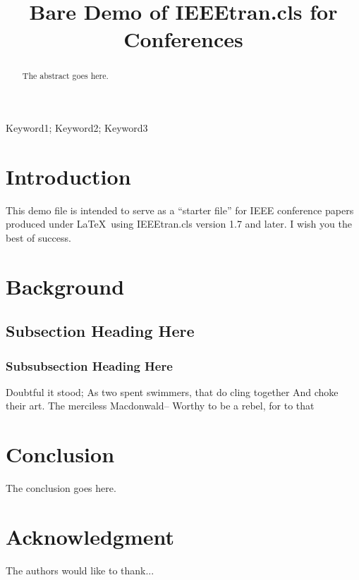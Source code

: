 \documentclass[conference, letterpaper]{IEEEtran}
\begin{document}
\title{Bare Demo of IEEEtran.cls for Conferences}

\author{
}

\maketitle


\begin{abstract}
The abstract goes here.
\end{abstract}


\begin{IEEEkeywords}
Keyword1; Keyword2; Keyword3
\end{IEEEkeywords}

\IEEEpeerreviewmaketitle



\section{Introduction}
This demo file is intended to serve as a ``starter file''
for IEEE conference papers produced under \LaTeX\ using
IEEEtran.cls version 1.7 and later.
I wish you the best of success.

\section{Background}
	

\subsection{Subsection Heading Here}


\subsubsection{Subsubsection Heading Here}
Doubtful it stood;
As two spent swimmers, that do cling together
And choke their art. The merciless Macdonwald--
Worthy to be a rebel, for to that


\section{Conclusion}
The conclusion goes here.


\section*{Acknowledgment}


The authors would like to thank...



\end{document}
